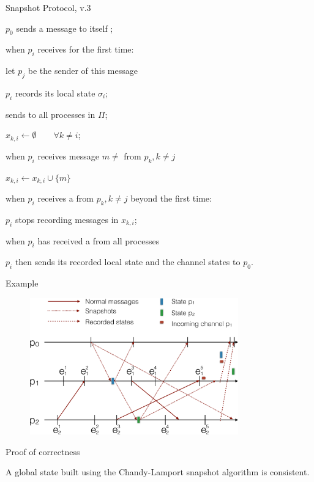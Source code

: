 \begin{frame}{Snapshot Protocol, v.3}
	
\BEL
\item $p_0$ sends a message \SNAPSHOT to itself ;
\item when $p_i$ receives \SNAPSHOT for the \alert{first time}:
  \BI 
  \item let $p_j$ be the sender of this message
  \item $p_i$ records its local state $\sigma_i$;
  \item sends \SNAPSHOT to all processes in $\Pi$;
  \item $x_{k,i} \gets \emptyset \qquad \forall k \neq i$;
  \EI
\item when $p_i$ receives message $m \neq$ \SNAPSHOT from $p_k, k \neq j$
  \BI
  \item $x_{k,i} \gets x_{k,i} \cup \{ m \}$
  \EI
\item when $p_i$ receives a \SNAPSHOT from
  $p_k, k \neq j$ beyond the \alert{first time}:
  \BI
  \item $p_i$ stops recording messages in $x_{k,i}$;
  \EI
\item when $p_i$ has received a \SNAPSHOT
  from all processes
  \BI
  \item $p_i$ then sends its recorded local state and the channel states to $p_0$.
  \EI
\EEL

\end{frame}

\begin{frame}{Example}
\begin{figure} 
\includegraphics[width=9cm]{figs/03/diagram9}
\end{figure}
\end{frame}

\begin{frame}{Proof of correctness}
	
\begin{theorem}
A global state built using the Chandy-Lamport snapshot algorithm is consistent.
\end{theorem}
\end{frame}


